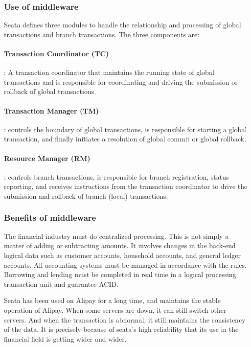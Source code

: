 \documentclass[conference]{IEEEtran}
\begin{document}
\subsubsection{Use of middleware}
Seata defines three modules to handle the relationship and processing of global transactions and branch transactions. The three components are:

\paragraph{Transaction Coordinator (TC)}: A transaction coordinator that maintains the running state of global transactions and is responsible for coordinating and driving the submission or rollback of global transactions.
\paragraph{Transaction Manager (TM)}: controls the boundary of global transactions, is responsible for starting a global transaction, and finally initiates a resolution of global commit or global rollback.
\paragraph{Resource Manager (RM)}: controls branch transactions, is responsible for branch registration, status reporting, and receives instructions from the transaction coordinator to drive the submission and rollback of branch (local) transactions.

\subsubsection{Benefits of middleware}
The financial industry must do centralized processing. This is not simply a matter of adding or subtracting amounts. It involves changes in the back-end logical data such as customer accounts, household accounts, and general ledger accounts. All accounting systems must be managed in accordance with the rules. Borrowing and lending must be completed in real time in a logical processing transaction unit and guarantee ACID.

Seata has been used on Alipay for a long time, and maintains the stable operation of Alipay. When some servers are down, it can still switch other servers. And when the transaction is abnormal, it still maintains the consistency of the data. It is precisely because of seata's high reliability that its use in the financial field is getting wider and wider.
\end{document}
